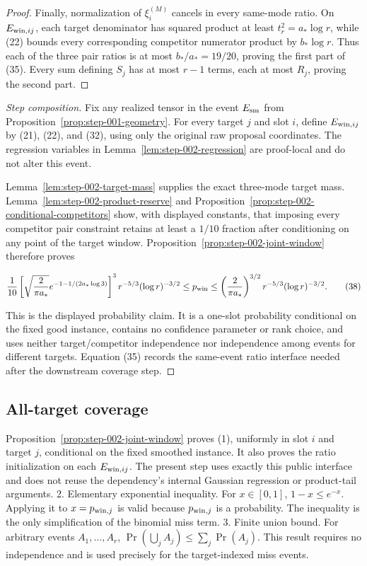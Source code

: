 \begin{proposition}
\begin{proof}
Finally, normalization of $\xi_i^{(M)}$ cancels in every same-mode ratio.
On $E_{{\rm win},ij}$, each target denominator has squared product at least
$t_r^2=a_*\log r$, while (22) bounds every corresponding competitor
numerator product by $b_*\log r$. Thus each of the three pair ratios is at
most $b_*/a_*=19/20$, proving the first part of (35). Every sum defining
$S_j$ has at most $r-1$ terms, each at most $R_j$, proving the second part.


\end{proof}
\end{proposition}
\begin{proof}[Step composition]
Fix any realized tensor in the event $E_{\rm sm}$ from Proposition~\ref{prop:step-001-geometry}.
For every target $j$ and slot $i$, define $E_{{\rm win},ij}$ by (21),
(22), and (32), using only the original raw proposal coordinates. The
regression variables in Lemma~\ref{lem:step-002-regression} are proof-local
and do not alter this event.

Lemma~\ref{lem:step-002-target-mass} supplies the exact three-mode target
mass. Lemma~\ref{lem:step-002-product-reserve} and
Proposition~\ref{prop:step-002-conditional-competitors} show, with displayed
constants, that imposing every competitor pair constraint retains at least a
$1/10$ fraction after conditioning on any point of the target window.
Proposition~\ref{prop:step-002-joint-window} therefore proves

\[
{1\over10}\left[\sqrt{2\over\pi a_*}
e^{-1-1/(2a_*\log3)}\right]^3
r^{-5/3}(\log r)^{-3/2}
\le p_{\rm win}
\le
\left({2\over\pi a_*}\right)^{3/2}
r^{-5/3}(\log r)^{-3/2}.
\tag{38}
\]

This is the displayed probability claim. It is a one-slot probability
conditional on the fixed good instance, contains no confidence parameter or
rank choice, and uses neither target/competitor independence nor independence
among events for different targets. Equation (35) records the same-event
ratio interface needed after the downstream coverage step.
\end{proof}

\subsection{All-target coverage}\label{app:step-003}

Proposition~\ref{prop:step-002-joint-window}
   proves (1), uniformly in slot \(i\) and
   target \(j\), conditional on the fixed smoothed instance. It also proves
   the ratio initialization on each \(E_{{\rm win},ij}\). The present step
   uses exactly this public interface and does not reuse the dependency's
   internal Gaussian regression or product-tail arguments.
2. Elementary exponential inequality. For \(x\in[0,1]\),
   \(1-x\le e^{-x}\). Applying it to \(x=p_{{\rm win},j}\) is valid because
   \(p_{{\rm win},j}\) is a probability. The inequality is the only
   simplification of the binomial miss term.
3. Finite union bound. For arbitrary events \(A_1,\ldots,A_r\),
   \(\Pr(\bigcup_jA_j)\le\sum_j\Pr(A_j)\). This result requires no
   independence and is used precisely for the target-indexed miss events.

